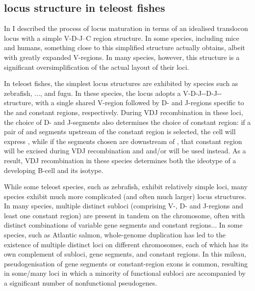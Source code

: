 \subsection{\igh{} locus structure in teleost fishes}

In  I described the process of \igh{} locus maturation in terms of an idealised translocon locus with a simple V-D-J--C region structure. In some species, including mice and humans, something close to this simplified structure actually obtains, albeit with greatly expanded V-regions. %
In many species, however, this structure is a significant oversimplification of the actual layout of their \igh{} loci.

In teleost fishes, the simplest locus structures are exhibited by species such as zebrafish, ..., and fugu. In these species, the \igh{} locus adopts a V-D-J-\cz{}-D-J-\cm{}-\cd{} structure, with a single shared V-region followed by D- and J-regions specific to the  and  constant regions, respectively. During VDJ recombination in these loci, the choice of D- and J-segments also determines the choice of constant region: if a pair of \dh and \jh segments upstream of the  constant region is selected, the cell will express , while if the segments chosen are downstream of , that constant region will be excised during VDJ recombination and  and/or  will be used instead. As a result, VDJ recombination in these species determines both the ideotype of a developing B-cell and its isotype.

While some teleost species, such as zebrafish, exhibit relatively simple \igh{} loci, many species exhibit much more complicated (and often much larger) locus structures. In many species, multiple distinct subloci (comprising V-, D- and J-regions and least one constant region) are present in tandem on the chromosome, often with distinct combinations of variable gene segments and constant regions... %
In some species, such as Atlantic salmon, whole-genome duplication has led to the existence of multiple distinct \igh{} loci on different chromosomes, each of which has its own complement of subloci, gene segments, and constant regions. In this mileau, pseudogenisation of gene segments or constant-region exons is common, resulting in some/many loci in which a minority of functional subloci are accompanied by a significant number of nonfunctional pseudogenes. %

